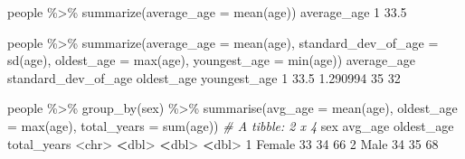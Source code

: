 \documentclass[
]{book}
\newenvironment{Shaded}{\begin{snugshade}}{\end{snugshade}}
\newcommand{\AttributeTok}[1]{\textcolor[rgb]{0.77,0.63,0.00}{#1}}
\newcommand{\CommentTok}[1]{\textcolor[rgb]{0.56,0.35,0.01}{\textit{#1}}}
\newcommand{\DecValTok}[1]{\textcolor[rgb]{0.00,0.00,0.81}{#1}}
\newcommand{\ErrorTok}[1]{\textcolor[rgb]{0.64,0.00,0.00}{\textbf{#1}}}
\newcommand{\FloatTok}[1]{\textcolor[rgb]{0.00,0.00,0.81}{#1}}
\newcommand{\FunctionTok}[1]{\textcolor[rgb]{0.00,0.00,0.00}{#1}}
\newcommand{\NormalTok}[1]{#1}
\newcommand{\SpecialCharTok}[1]{\textcolor[rgb]{0.00,0.00,0.00}{#1}}
\begin{document}
\begin{Shaded}
\begin{Highlighting}[]
\NormalTok{people }\SpecialCharTok{\%\textgreater{}\%} 
  \FunctionTok{summarize}\NormalTok{(}\AttributeTok{average\_age =} \FunctionTok{mean}\NormalTok{(age))}
\NormalTok{  average\_age}
\DecValTok{1}        \FloatTok{33.5}
\end{Highlighting}
\end{Shaded}

\begin{Shaded}
\begin{Highlighting}[]
\NormalTok{people }\SpecialCharTok{\%\textgreater{}\%} 
  \FunctionTok{summarize}\NormalTok{(}\AttributeTok{average\_age =} \FunctionTok{mean}\NormalTok{(age),}
            \AttributeTok{standard\_dev\_of\_age =} \FunctionTok{sd}\NormalTok{(age),}
            \AttributeTok{oldest\_age =} \FunctionTok{max}\NormalTok{(age),}
            \AttributeTok{youngest\_age =} \FunctionTok{min}\NormalTok{(age))}
\NormalTok{  average\_age standard\_dev\_of\_age oldest\_age youngest\_age}
\DecValTok{1}        \FloatTok{33.5}            \FloatTok{1.290994}         \DecValTok{35}           \DecValTok{32}
\end{Highlighting}
\end{Shaded}

\begin{Shaded}
\begin{Highlighting}[]
\NormalTok{people }\SpecialCharTok{\%\textgreater{}\%} 
  \FunctionTok{group\_by}\NormalTok{(sex) }\SpecialCharTok{\%\textgreater{}\%}
  \FunctionTok{summarise}\NormalTok{(}\AttributeTok{avg\_age =} \FunctionTok{mean}\NormalTok{(age),}
            \AttributeTok{oldest\_age =} \FunctionTok{max}\NormalTok{(age),}
            \AttributeTok{total\_years =} \FunctionTok{sum}\NormalTok{(age)) }
\CommentTok{\# A tibble: 2 x 4}
\NormalTok{  sex    avg\_age oldest\_age total\_years}
  \SpecialCharTok{\textless{}}\NormalTok{chr}\SpecialCharTok{\textgreater{}}    \ErrorTok{\textless{}}\NormalTok{dbl}\SpecialCharTok{\textgreater{}}      \ErrorTok{\textless{}}\NormalTok{dbl}\SpecialCharTok{\textgreater{}}       \ErrorTok{\textless{}}\NormalTok{dbl}\SpecialCharTok{\textgreater{}}
\DecValTok{1}\NormalTok{ Female      }\DecValTok{33}         \DecValTok{34}          \DecValTok{66}
\DecValTok{2}\NormalTok{ Male        }\DecValTok{34}         \DecValTok{35}          \DecValTok{68}
\end{Highlighting}
\end{Shaded}
\end{document}
